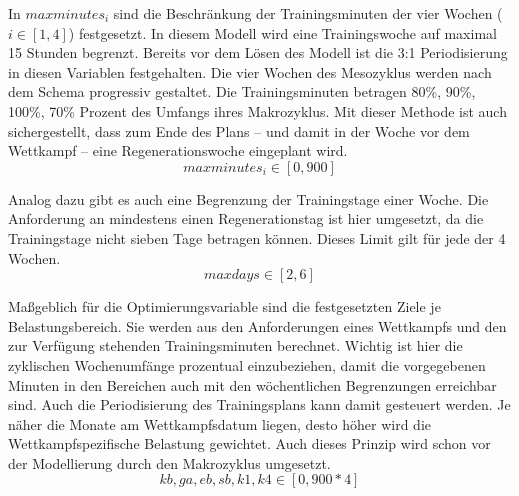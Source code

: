 In $maxminutes_i$ sind die Beschränkung der Trainingsminuten der vier Wochen ($ i \in [ 1, 4]$) festgesetzt. In diesem Modell wird eine Trainingswoche auf maximal 15 Stunden begrenzt. Bereits vor dem Lösen des Modell ist die 3:1 Periodisierung in diesen Variablen festgehalten. Die vier Wochen des Mesozyklus werden nach dem Schema progressiv gestaltet. Die Trainingsminuten betragen 80\%, 90\%, 100\%, 70\% Prozent des Umfangs ihres Makrozyklus. Mit dieser Methode ist auch sichergestellt, dass zum Ende des Plans -- und damit in der Woche vor dem Wettkampf -- eine Regenerationswoche eingeplant wird.
\begin{equation}
     maxminutes_i \in [0, 900] 
\end{equation}


Analog dazu gibt es auch eine Begrenzung der Trainingstage einer Woche. Die Anforderung an mindestens einen Regenerationstag ist hier umgesetzt, da die Trainingstage nicht sieben Tage betragen können. Dieses Limit gilt für jede der 4 Wochen.
\begin{equation}
\label{equation:maxDays}
     maxdays \in [2, 6]
\end{equation}

Maßgeblich für die Optimierungsvariable sind die festgesetzten Ziele je Belastungsbereich. Sie werden aus den Anforderungen eines Wettkampfs und den zur Verfügung stehenden Trainingsminuten berechnet. Wichtig ist hier die zyklischen Wochenumfänge prozentual einzubeziehen, damit die vorgegebenen Minuten in den Bereichen auch mit den wöchentlichen Begrenzungen erreichbar sind.\newline
Auch die Periodisierung des Trainingsplans kann damit gesteuert werden. Je näher die Monate am Wettkampfsdatum liegen, desto höher wird die Wettkampfspezifische Belastung gewichtet. Auch dieses Prinzip wird schon vor der Modellierung durch den Makrozyklus umgesetzt.
\begin{equation}
    kb, ga, eb, sb, k1, k4 \in [0, 900*4]
\end{equation}

